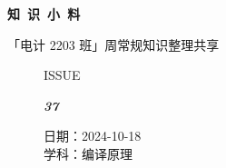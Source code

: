 \documentclass[UTF8]{ctexart}
\newcommand\Black[1]{\textcolor[gray]{0.3}{#1}}
\newcommand\Brown[1]{\textcolor[HTML]{998A4E}{#1}}
\newcommand\IssueNumber{37}
\newcommand\Date{2024-10-18}
\newcommand\Subject{编译原理}
\begin{document}
\BgThispage
\begin{center}
\phantom{...}

{\Large\textcolor{brown!40!white}{}}

\vspace{-2em}

{\Huge\bfseries\TitleFont \Black{知\ 识\ 小\ 料}}


\vspace{-0.1cm}
{\footnotesize \Brown{「电计 2203 班」周常规知识整理共享}}
\end{center}

\vspace{-0.5cm}


\begin{figure}[H]
\hspace{1cm}
\begin{minipage}[t]{0.3\textwidth}
\centering
    \Brown{\Genshin ISSUE}

    \vspace{-0.6cm}
    \Huge \Issue\slshape\bfseries\Black{\IssueNumber}
\end{minipage}
\hfill
\begin{minipage}[t]{0.35\textwidth}
\centering
    \Brown{日期：\Date} \\
\vspace{-0.1cm}
    \Brown{学科：\Subject} \\
\end{minipage}
\hspace{0.8cm}
\end{figure}
\end{document}
